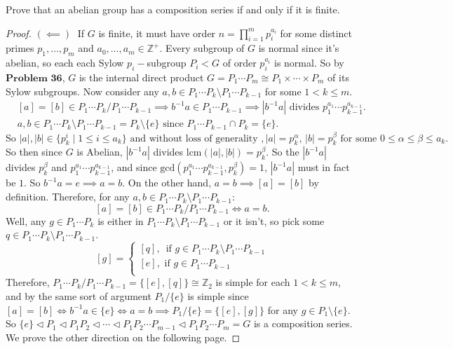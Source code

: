 \documentclass[addpoints,10pt]{exam}
\theoremstyle{plain}
\theoremstyle{definition}
\newtheorem{prob}[thm]{Problem}
\theoremstyle{plain}
\theoremstyle{plain}
\theoremstyle{definition}
\let\oldprob\prob
\let\endoldprob\endprob
\renewenvironment{prob}
  {\begin{singlespace}\oldprob}
  {\endoldprob\end{singlespace}}
\newcommand{\ZZ}{\ensuremath{\mathbb{Z}}}
\begin{document}
\setcounter{thm}{39}   %
\begin{prob}
Prove that an abelian group has a composition series if and only if it is finite.
\end{prob}

\begin{proof}
  $(\impliedby)\;$ If $G$ is finite, it must have order $n=\prod_{i=1}^{m}p_{i}^{a_{i}}$ for some distinct primes $p_{1},\hdots, p_{m}$ and $a_{0},\hdots, a_{m}\in \ZZ^{+}.$ Every subgroup of $G$ is normal since it's abelian, so each each Sylow $p_{i}-$subgroup $P_{i}<G$ of order $p_{i}^{a_{i}}$ is normal. So by $\textbf{Problem 36}$, $G$ is the internal direct product $G=P_{1}\cdots P_{m}\cong P_{1}\times \cdots \times P_{m}$ of its Sylow subgroups. Now consider any $a,b\in P_{1}\cdots P_{k}\setminus P_{1}\cdots P_{k-1}$ for some $1< k\leq m$. 
  \begin{align*}
    &[a]=[b]\in P_{1}\cdots P_{k}/ P_{1}\cdots P_{k-1} \implies b^{-1}a\in P_{1}\cdots P_{k-1}\implies |b^{-1}a|\text{ divides }p_{1}^{a_{1}}\cdots p_{k-1}^{a_{k-1}}.\\
    &a,b\in P_{1}\cdots P_{k}\setminus P_{1}\cdots P_{k-1}=P_{k}\setminus\{e\}\text{ since }P_{1}\cdots P_{k-1}\cap P_{k}=\{e\}.
  \end{align*}
  $\text{So }|a|,|b|\in \{p_{k}^{i}\mid 1\leq i\leq a_{k}\} \text{ and without loss of generality },|a|=p_{k}^\alpha,\,|b|=p_{k}^{\beta}\text{ for some }0 \leq \alpha\leq \beta\leq a_{k}.$ So then since $G$ is Abelian, $|b^{-1}a|$ divides $\mathrm{lcm}(|a|,|b|)=p_{k}^{\beta}$. So the $|b^{-1}a|$ divides $p_{k}^{\beta}$ and $p_{1}^{a_{1}}\cdots p_{k-1}^{a_{k-1}}$, and since $\mathrm{gcd}(p_{1}^{a_{1}}\cdots p_{k-1}^{a_{k-1}},p_{k}^{\beta})=1$, $|b^{-1}a|$ must in fact be $1$. So $b^{-1}a=e\implies a=b$. On the other hand, $a=b\implies [a]=[b]$ by definition. Therefore, for any $a,b\in P_{1}\cdots P_{k}\setminus P_{1}\cdots P_{k-1}$:
    $$[a]=[b]\in P_{1}\cdots P_{k}/ P_{1}\cdots P_{k-1}\iff a=b.$$
  Well, any $g\in P_{1}\cdots P_{k}$ is either in $P_{1}\cdots P_{k}\setminus P_{1}\cdots P_{k-1}$ or it isn't, so pick some $q\in P_{1}\cdots P_{k}\setminus P_{1}\cdots P_{k-1}$.
  $$[g]=\begin{cases}[q],\,\text{ if }g\in P_{1}\cdots P_{k}\setminus P_{1}\cdots P_{k-1}\\ [e],\text{ if }g\in P_{1}\cdots P_{k-1}\\ \end{cases}$$
  Therefore, $P_{1}\cdots P_{k}/ P_{1}\cdots P_{k-1}=\{[e],[q]\}\cong \ZZ_{2}$ is simple for each $1< k\leq m$, and by the same sort of argument $P_{1}/\{e\}$ is simple since $[a]=[b]\iff b^{-1}a\in \{e\}\iff a=b\implies P_{1}/\{e\}=\{[e],[g]\}$ for any $g\in P_{1}\setminus\{e\}$. So $\{e\} \triangleleft P_{1}\triangleleft P_{1}P_{2} \triangleleft \cdots \triangleleft P_{1}P_{2} \cdots P_{m-1}\triangleleft P_{1}P_{2}\cdots P_{m}=G$ is a composition series. We prove the other direction on the following page.


\end{proof}
\end{document}
